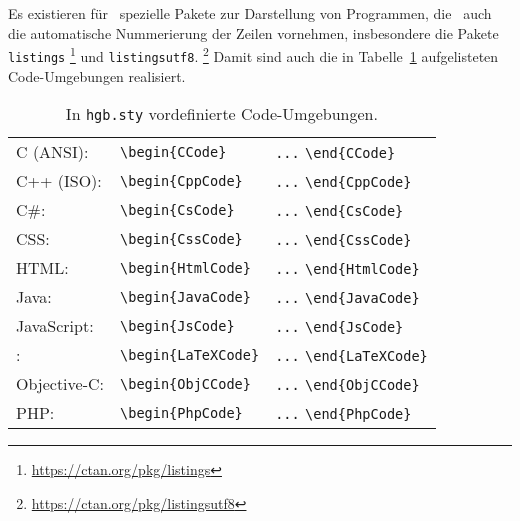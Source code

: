 Es existieren für \latex\ spezielle Pakete zur Darstellung von Programmen,
die \ua\ auch die automatische Nummerierung der Zeilen vornehmen,
insbesondere die Pakete \texttt{listings}%
\footnote{\url{https://ctan.org/pkg/listings}}
und \texttt{listingsutf8}.%
\footnote{\url{https://ctan.org/pkg/listingsutf8}}
Damit sind auch die in Tabelle~\ref{tab:CodeUmgebungen} aufgelisteten
Code-Umgebungen realisiert.
%
\begin{table}
\caption{In \nolinkurl{hgb.sty} vordefinierte Code-Umgebungen.}
\label{tab:CodeUmgebungen}
\centering
\begin{tabular}{@{}lll@{}}
	\toprule
	C (ANSI):    & \verb!\begin{CCode}!
		& \verb!...! \verb!\end{CCode}! \\
	C++ (ISO):   & \verb!\begin{CppCode}!
		& \verb!...! \verb!\end{CppCode}! \\
	C\#:         & \verb!\begin{CsCode}!
		& \verb!...! \verb!\end{CsCode}! \\
	CSS:         & \verb!\begin{CssCode}!
		& \verb!...! \verb!\end{CssCode}! \\
	HTML:        & \verb!\begin{HtmlCode}!
		& \verb!...! \verb!\end{HtmlCode}! \\
	Java:        & \verb!\begin{JavaCode}!
		& \verb!...! \verb!\end{JavaCode}! \\
	JavaScript:  & \verb!\begin{JsCode}!
		& \verb!...! \verb!\end{JsCode}! \\
	\latex:      & \verb!\begin{LaTeXCode}!
		& \verb!...! \verb!\end{LaTeXCode}! \\
	Objective-C: & \verb!\begin{ObjCCode}!
		& \verb!...! \verb!\end{ObjCCode}! \\
	PHP:         & \verb!\begin{PhpCode}!
		& \verb!...! \verb!\end{PhpCode}! \\

\end{tabular}
\end{table}
